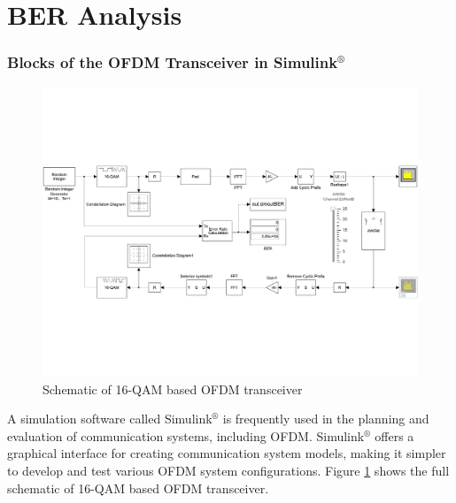 \documentclass[11pt]{article}
\numberwithin{figure}{section}
\numberwithin{equation}{section}
\begin{document}
\part{BER Analysis}

\section{Blocks of the OFDM Transceiver in Simulink$^\circledR$}
\begin{figure}[!ht]
    \centering
    \includegraphics[width=1\textwidth]{images/simulink.pdf}
    \caption{Schematic of 16-QAM based OFDM transceiver}
    \label{fig:simulink}
\end{figure}
A simulation software called Simulink$^\circledR$ is frequently used in the planning and evaluation of communication systems, including OFDM. Simulink$^\circledR$ offers a graphical interface for creating communication system models, making it simpler to develop and test various OFDM system configurations. Figure \ref{fig:simulink} shows the full schematic of 16-QAM based OFDM transceiver.
\end{document}
